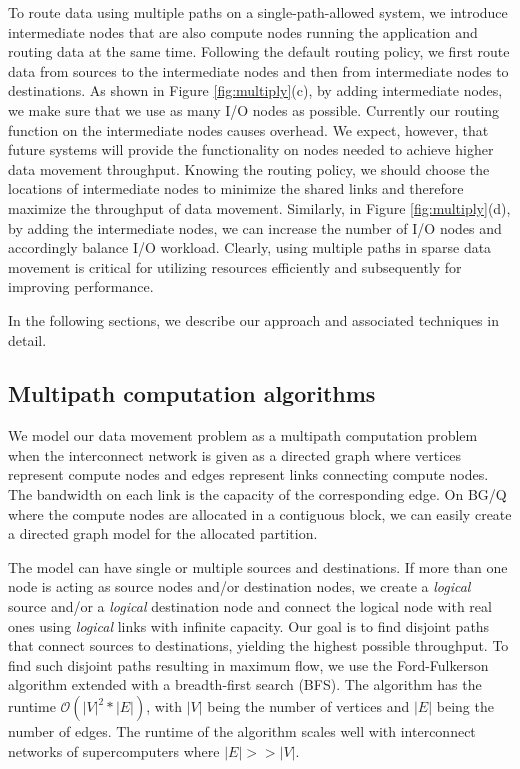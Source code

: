 \documentclass[final,5p,times]{elsarticle}
\begin{document}
To route data using multiple paths on a single-path-allowed system, we introduce intermediate nodes that are also compute nodes running the application and routing data at the same time. Following the default routing policy, we first route data from sources to the intermediate nodes and then from intermediate nodes to destinations. As shown in Figure \ref{fig:multiply}(c), by adding intermediate nodes, we make sure that we use as many I/O nodes as possible. Currently our routing function on the intermediate nodes causes overhead. We expect, however, that future systems will provide the functionality on nodes needed to achieve higher data movement throughput.  Knowing the routing policy, we should choose the locations of intermediate nodes to minimize the shared links and therefore maximize the throughput of data movement. Similarly, in Figure \ref{fig:multiply}(d), by adding the intermediate nodes, we can increase the number of I/O nodes and accordingly balance I/O workload. Clearly, using multiple paths in sparse data movement is critical for utilizing resources efficiently and subsequently for improving performance.

In the following sections, we describe our approach and associated techniques in detail.

\subsection{Multipath computation algorithms}
We model our data movement problem as a multipath computation problem when the interconnect network is given as a directed graph where vertices represent compute nodes and edges represent links connecting compute nodes. The bandwidth on each link is the capacity of the corresponding edge. On BG/Q where the compute nodes are allocated in a contiguous block, we can easily create a directed graph model for the allocated partition.

The model can have single or multiple sources and destinations. If more than one node is acting as source nodes and/or destination nodes, we create a {\em logical} source and/or a {\em logical} destination node and connect the logical node with real ones using {\em logical} links with infinite capacity. Our goal is to find disjoint paths that connect sources to destinations, yielding the highest possible throughput. To find such disjoint paths resulting in maximum flow, we use the Ford-Fulkerson algorithm extended with a breadth-first search (BFS). The algorithm has the runtime $\mathcal{O}(|V|^2*|E|)$, with $|V|$ being the number of vertices and $|E|$ being the number of edges. The runtime of the algorithm scales well with interconnect networks of supercomputers where $|E| >> |V|$.
\end{document}
